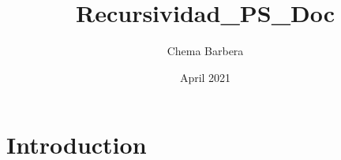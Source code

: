 \documentclass{article}
\title{Recursividad_PS_Doc}
\author{Chema Barbera}
\date{April 2021}
\begin{document}
\maketitle

\section{Introduction}
\end{document}
